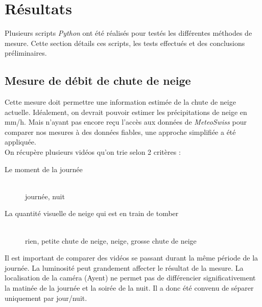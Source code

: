 \section{Résultats}
Plusieurs scripts \emph{Python} ont été réalisés pour testés les différentes
méthodes de mesure. Cette section détails ces scripts, les tests effectués
et des conclusions préliminaires.

\subsection{Mesure de débit de chute de neige} \label{snowfall}
Cette mesure doit permettre une information estimée de la chute de neige
actuelle. Idéalement, on devrait pouvoir estimer les précipitations de neige
en mm/h. Mais n'ayant pas encore reçu l'accès aux données de \emph{MeteoSwiss}
pour comparer nos mesures à des données fiables, une approche simplifiée a été
appliquée.\\
On récupère plusieurs vidéos qu'on trie selon 2 critères :
\begin{description}
    \item[Le moment de la journée] \hfill \\
    journée, nuit
    \item[La quantité visuelle de neige qui est en train de tomber] \hfill \\
    rien, petite chute de neige, neige, grosse chute de neige
\end{description}
Il est important de comparer des vidéos se passant durant la même période de la journée.
La luminosité peut grandement affecter le résultat de la mesure. La localisation
de la caméra (Ayent) ne permet pas de différencier significativement la matinée
de la journée et la soirée de la nuit. Il a donc été convenu de séparer uniquement
par jour/nuit.

